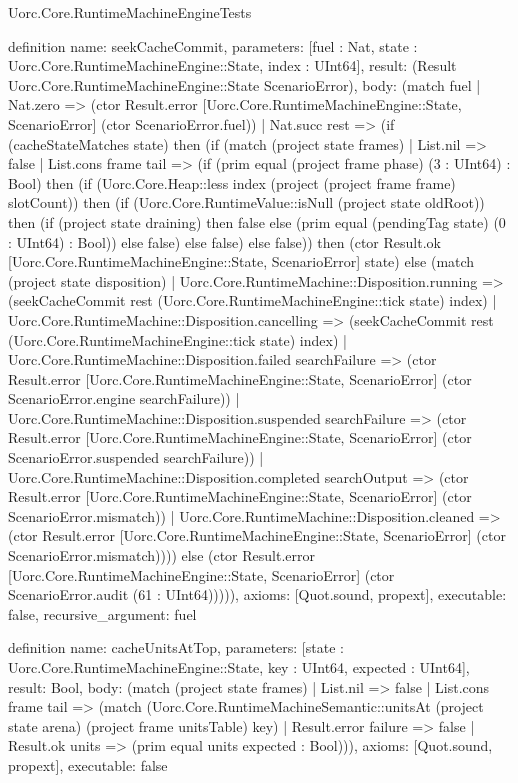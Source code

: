 \begin{lexlean}{Uorc.Core.RuntimeMachineEngineTests}
\begin{semanticmodule}
definition{
  name: seekCacheCommit,
  parameters: [fuel : Nat, state : Uorc.Core.RuntimeMachineEngine::State, index : UInt64],
  result: (Result Uorc.Core.RuntimeMachineEngine::State ScenarioError),
  body: (match fuel
    | Nat.zero => (ctor Result.error [Uorc.Core.RuntimeMachineEngine::State, ScenarioError] (ctor ScenarioError.fuel))
    | Nat.succ rest => (if (cacheStateMatches state) then (if (match (project state frames)
      | List.nil => false
      | List.cons frame tail => (if (prim equal (project frame phase) (3 : UInt64) : Bool) then (if (Uorc.Core.Heap::less index (project (project frame frame) slotCount)) then (if (Uorc.Core.RuntimeValue::isNull (project state oldRoot)) then (if (project state draining) then false else (prim equal (pendingTag state) (0 : UInt64) : Bool)) else false) else false) else false)) then (ctor Result.ok [Uorc.Core.RuntimeMachineEngine::State, ScenarioError] state) else (match (project state disposition)
      | Uorc.Core.RuntimeMachine::Disposition.running => (seekCacheCommit rest (Uorc.Core.RuntimeMachineEngine::tick state) index)
      | Uorc.Core.RuntimeMachine::Disposition.cancelling => (seekCacheCommit rest (Uorc.Core.RuntimeMachineEngine::tick state) index)
      | Uorc.Core.RuntimeMachine::Disposition.failed searchFailure => (ctor Result.error [Uorc.Core.RuntimeMachineEngine::State, ScenarioError] (ctor ScenarioError.engine searchFailure))
      | Uorc.Core.RuntimeMachine::Disposition.suspended searchFailure => (ctor Result.error [Uorc.Core.RuntimeMachineEngine::State, ScenarioError] (ctor ScenarioError.suspended searchFailure))
      | Uorc.Core.RuntimeMachine::Disposition.completed searchOutput => (ctor Result.error [Uorc.Core.RuntimeMachineEngine::State, ScenarioError] (ctor ScenarioError.mismatch))
      | Uorc.Core.RuntimeMachine::Disposition.cleaned => (ctor Result.error [Uorc.Core.RuntimeMachineEngine::State, ScenarioError] (ctor ScenarioError.mismatch)))) else (ctor Result.error [Uorc.Core.RuntimeMachineEngine::State, ScenarioError] (ctor ScenarioError.audit (61 : UInt64))))),
  axioms: [Quot.sound, propext],
  executable: false,
  recursive_argument: fuel
}

definition{
  name: cacheUnitsAtTop,
  parameters: [state : Uorc.Core.RuntimeMachineEngine::State, key : UInt64, expected : UInt64],
  result: Bool,
  body: (match (project state frames)
    | List.nil => false
    | List.cons frame tail => (match (Uorc.Core.RuntimeMachineSemantic::unitsAt (project state arena) (project frame unitsTable) key)
      | Result.error failure => false
      | Result.ok units => (prim equal units expected : Bool))),
  axioms: [Quot.sound, propext],
  executable: false
}


\end{semanticmodule}
\end{lexlean}
